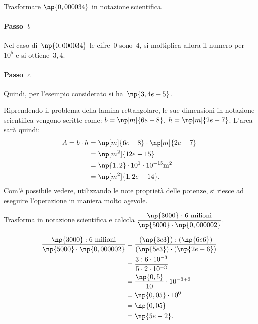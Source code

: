\pagebreak

\begin{exrig}
 \begin{esempio}
Trasformare $\np{0,000034}$ in notazione scientifica.
\paragraph{Passo~$b$} Nel caso di~$\np{0,000034}$ le cifre~$0$ sono~$4$, si moltiplica allora il numero per~$10^5$ e si
ottiene~$3,4$.
\paragraph{Passo~$c$} Quindi, per l'esempio considerato si ha~$\np{3,4e-5}$.
 \end{esempio}

\begin{esempio}
Riprendendo il problema della lamina rettangolare, le sue dimensioni in notazione scientifica vengono scritte come:
$b=\np[m]{6e-8}$, $h=\np[m]{2e-7}$.
L'area sarà quindi:
\begin{align*}
A =b\cdot h &=\np[m]{6e-8} \cdot \np[m]{2e-7}\\
 &=\np[m^2]{12e-15}\\
 &=\np{1,2}\cdot 10^1\cdot 10^{-15}\unit{m^2}\\
 &=\np[m^2]{1,2e-14}.
\end{align*}
Com'è possibile vedere, utilizzando le note proprietà delle potenze, si riesce ad eseguire l'operazione
in maniera molto agevole.
\end{esempio}

\begin{esempio}
Trasforma in notazione scientifica e calcola
$\displaystyle{\frac{\np{3000}:6\text{ milioni}}{\np{5000}\cdot\np{0,000002}}}$.

\begin{align*}
\frac{\np{3000}:6\text{ milioni}}{\np{5000}\cdot\np{0,000002}}&=\frac{(\np{3e3}):(\np{6e6})}{(\np{5e3})\cdot(\np{2e-6})}\\
 &=\frac{3:6\cdot10^{-3}}{5\cdot 2\cdot 10^{-3}}\\
 &=\frac{\np{0,5}}{10}\cdot10^{-3+3}\\
 &=\np{0,05}\cdot10^0\\
 &=\np{0,05}\\
 &=\np{5e-2}.
\end{align*}
\end{esempio}
\end{exrig}

